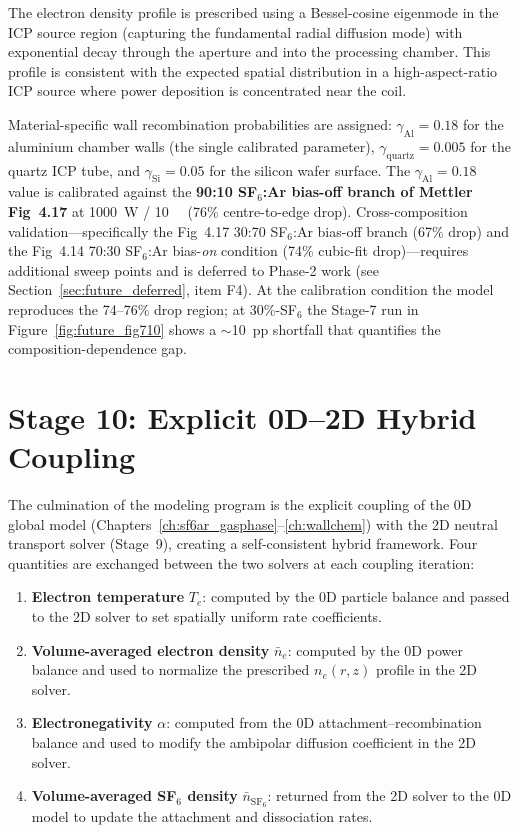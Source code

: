 \documentclass[11pt,a4paper]{report}
\newcommand{\Te}{T_e}
\begin{document}
The electron density profile is prescribed using a Bessel-cosine eigenmode in the ICP source region (capturing the fundamental radial diffusion mode) with exponential decay through the aperture and into the processing chamber.  This profile is consistent with the expected spatial distribution in a high-aspect-ratio ICP source where power deposition is concentrated near the coil.

Material-specific wall recombination probabilities are assigned: $\gamma_\mathrm{Al} = 0.18$ for the aluminium chamber walls (the single calibrated parameter), $\gamma_\mathrm{quartz} = 0.005$ for the quartz ICP tube, and $\gamma_\mathrm{Si} = 0.05$ for the silicon wafer surface.  The $\gamma_\mathrm{Al} = 0.18$ value is calibrated against the \textbf{90:10 SF$_6$:Ar bias-off branch of Mettler Fig~4.17} at \SI{1000}{\watt} / \SI{10}{\milli\torr} (76\% centre-to-edge drop).  Cross-composition validation---specifically the Fig~4.17 30:70 SF$_6$:Ar bias-off branch (67\% drop) and the Fig~4.14 70:30 SF$_6$:Ar bias-\emph{on} condition (74\% cubic-fit drop)---requires additional sweep points and is deferred to Phase-2 work (see Section~\ref{sec:future_deferred}, item F4).  At the calibration condition the model reproduces the 74--76\% drop region; at 30\%-SF$_6$ the Stage-7 run in Figure~\ref{fig:future_fig710} shows a $\sim$10~pp shortfall that quantifies the composition-dependence gap.

\section{Stage 10: Explicit 0D--2D Hybrid Coupling}
\label{sec:future_stage10}

The culmination of the modeling program is the explicit coupling of the 0D global model (Chapters~\ref{ch:sf6ar_gasphase}--\ref{ch:wallchem}) with the 2D neutral transport solver (Stage~9), creating a self-consistent hybrid framework.  Four quantities are exchanged between the two solvers at each coupling iteration:

\begin{enumerate}[nosep]
\item \textbf{Electron temperature} $\Te$: computed by the 0D particle balance and passed to the 2D solver to set spatially uniform rate coefficients.
\item \textbf{Volume-averaged electron density} $\bar{n}_e$: computed by the 0D power balance and used to normalize the prescribed $n_e(r,z)$ profile in the 2D solver.
\item \textbf{Electronegativity} $\alpha$: computed from the 0D attachment--recombination balance and used to modify the ambipolar diffusion coefficient in the 2D solver.
\item \textbf{Volume-averaged SF$_6$ density} $\bar{n}_{\mathrm{SF}_6}$: returned from the 2D solver to the 0D model to update the attachment and dissociation rates.
\end{enumerate}
\end{document}
